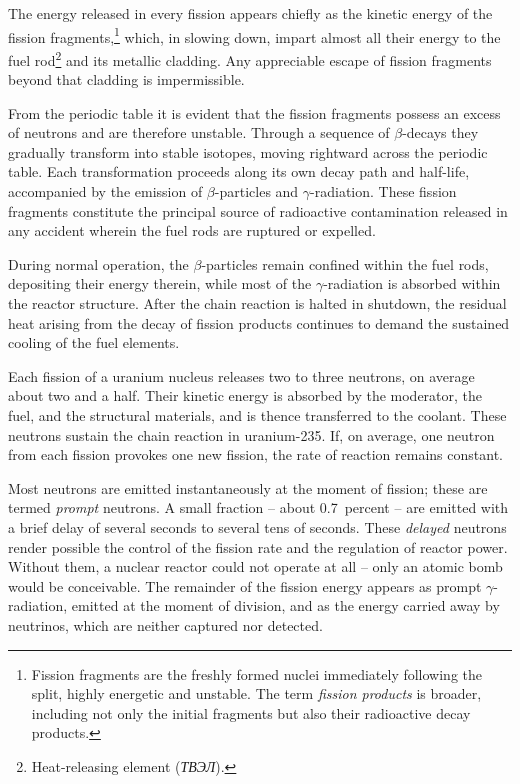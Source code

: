 \documentclass[openright]{bookest}
\begin{document}
The energy released in every fission appears chiefly as the kinetic energy of the fission fragments,\footnote{Fission fragments are the freshly formed nuclei immediately following the split, highly energetic and unstable. The term \textit{fission products} is broader, including not only the initial fragments but also their radioactive decay products.} which, in slowing down, impart almost all their energy to the fuel rod\footnote{Heat-releasing element (\textit{ТВЭЛ}).} and its metallic cladding. Any appreciable escape of fission fragments beyond that cladding is impermissible.

From the periodic table it is evident that the fission fragments possess an excess of neutrons and are therefore unstable. Through a sequence of $\beta$-decays they gradually transform into stable isotopes, moving rightward across the periodic table. Each transformation proceeds along its own decay path and half-life, accompanied by the emission of $\beta$-particles and $\gamma$-radiation. These fission fragments constitute the principal source of radioactive contamination released in any accident wherein the fuel rods are ruptured or expelled.

During normal operation, the $\beta$-particles remain confined within the fuel rods, depositing their energy therein, while most of the $\gamma$-radiation is absorbed within the reactor structure. After the chain reaction is halted in shutdown, the residual heat arising from the decay of fission products continues to demand the sustained cooling of the fuel elements.

Each fission of a uranium nucleus releases two to three neutrons, on average about two and a half. Their kinetic energy is absorbed by the moderator, the fuel, and the structural materials, and is thence transferred to the coolant. These neutrons sustain the chain reaction in uranium-235. If, on average, one neutron from each fission provokes one new fission, the rate of reaction remains constant.

Most neutrons are emitted instantaneously at the moment of fission; these are termed \textit{prompt} neutrons. A small fraction -- about \num{0.7}~percent -- are emitted with a brief delay of several seconds to several tens of seconds. These \textit{delayed} neutrons render possible the control of the fission rate and the regulation of reactor power. Without them, a nuclear reactor could not operate at all -- only an atomic bomb would be conceivable. The remainder of the fission energy appears as prompt $\gamma$-radiation, emitted at the moment of division, and as the energy carried away by neutrinos, which are neither captured nor detected.
\end{document}
